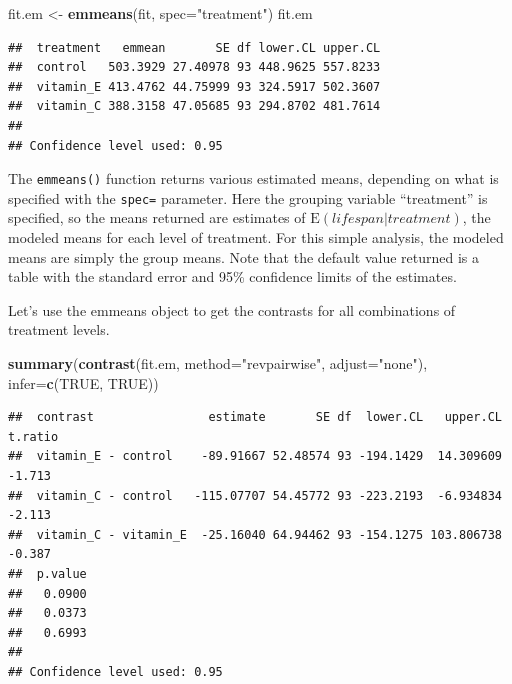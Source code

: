 \documentclass[]{book}
\newenvironment{Shaded}{\begin{snugshade}}{\end{snugshade}}
\newcommand{\KeywordTok}[1]{\textcolor[rgb]{0.13,0.29,0.53}{\textbf{#1}}}
\newcommand{\DataTypeTok}[1]{\textcolor[rgb]{0.13,0.29,0.53}{#1}}
\newcommand{\StringTok}[1]{\textcolor[rgb]{0.31,0.60,0.02}{#1}}
\newcommand{\OtherTok}[1]{\textcolor[rgb]{0.56,0.35,0.01}{#1}}
\newcommand{\NormalTok}[1]{#1}
\theoremstyle{definition}
\theoremstyle{definition}
\theoremstyle{definition}
\theoremstyle{remark}
\begin{document}
\begin{Shaded}
\begin{Highlighting}[]
\NormalTok{fit.em <-}\StringTok{ }\KeywordTok{emmeans}\NormalTok{(fit, }\DataTypeTok{spec=}\StringTok{"treatment"}\NormalTok{)}
\NormalTok{fit.em}
\end{Highlighting}
\end{Shaded}

\begin{verbatim}
##  treatment   emmean       SE df lower.CL upper.CL
##  control   503.3929 27.40978 93 448.9625 557.8233
##  vitamin_E 413.4762 44.75999 93 324.5917 502.3607
##  vitamin_C 388.3158 47.05685 93 294.8702 481.7614
## 
## Confidence level used: 0.95
\end{verbatim}

The \texttt{emmeans()} function returns various estimated means,
depending on what is specified with the \texttt{spec=} parameter. Here
the grouping variable ``treatment'' is specified, so the means returned
are estimates of \(\mathrm{E}(lifespan | treatment)\), the modeled means
for each level of treatment. For this simple analysis, the modeled means
are simply the group means. Note that the default value returned is a
table with the standard error and 95\% confidence limits of the
estimates.

Let's use the emmeans object to get the contrasts for all combinations
of treatment levels.

\begin{Shaded}
\begin{Highlighting}[]
\KeywordTok{summary}\NormalTok{(}\KeywordTok{contrast}\NormalTok{(fit.em, }\DataTypeTok{method=}\StringTok{"revpairwise"}\NormalTok{, }\DataTypeTok{adjust=}\StringTok{"none"}\NormalTok{), }\DataTypeTok{infer=}\KeywordTok{c}\NormalTok{(}\OtherTok{TRUE}\NormalTok{, }\OtherTok{TRUE}\NormalTok{))}
\end{Highlighting}
\end{Shaded}

\begin{verbatim}
##  contrast                estimate       SE df  lower.CL   upper.CL t.ratio
##  vitamin_E - control    -89.91667 52.48574 93 -194.1429  14.309609  -1.713
##  vitamin_C - control   -115.07707 54.45772 93 -223.2193  -6.934834  -2.113
##  vitamin_C - vitamin_E  -25.16040 64.94462 93 -154.1275 103.806738  -0.387
##  p.value
##   0.0900
##   0.0373
##   0.6993
## 
## Confidence level used: 0.95
\end{verbatim}
\end{document}

